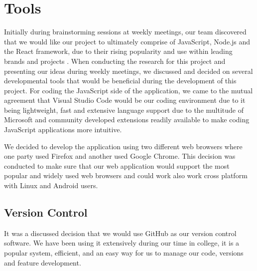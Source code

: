 \section{Tools}
Initially during brainstorming sessions at weekly meetings, our team discovered that we would like our project to ultimately comprise of JavaScript, Node.js and the React framework, due to their rising popularity and use within leading brands and projects \cite{borges2015popularity}. 
When conducting the research for this project and presenting our ideas during weekly meetings, we discussed and decided on several developmental tools that would be beneficial during the development of this project. For coding the JavaScript side of the application, we came to the mutual agreement that Visual Studio Code would be our coding environment due to it being lightweight, fast and extensive language support due to the multitude of Microsoft and community developed extensions readily available to make coding JavaScript applications more intuitive.

We decided to develop the application using two different web browsers where one party used Firefox and another used Google Chrome. This decision was conducted to make sure that our web application would support the most popular and widely used web browsers and could work also work cross platform with Linux and Android users.

\subsection{Version Control}
It was a discussed decision that we would use GitHub as our version control software. We have been using it extensively during our time in college, it is a popular system, efficient, and an easy way for us to manage our code, versions and feature development.

